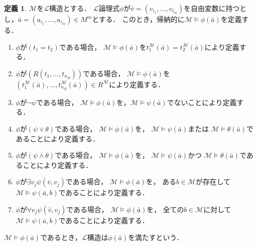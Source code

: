 \documentclass[uplatex, dvipdfmx]{jsarticle}
\numberwithin{equation}{section}
\theoremstyle{definition}
\newtheorem{definition}{定義}[section]
\begin{document}

\begin{definition}
     $\mathcal{M}$を$\mathcal{L}$構造とする．
     $\mathcal{L}$論理式$\phi$が$\bar{v} = (v_{i_1}, \dots, v_{i_m})$を自由変数に持つとし，$\bar{a} = (a_{i_1}, \dots, a_{i_m}) \in M^m$とする．
     このとき，帰納的に$\mathcal{M} \models \phi(\bar{a})$を定義する．
     \begin{enumerate}
          \item 
               $\phi$が$(t_1=t_2)$である場合，
               $\mathcal{M} \models \phi(\bar{a})$を$t_1^\mathcal{M}(\bar{a}) = t_2^\mathcal{M}(\bar{a})$により定義する．
          \item 
               $\phi$が$(R(t_1, \dots, t_{n_R}))$である場合，
               $\mathcal{M} \models \phi(\bar{a})$を$(t_1^\mathcal{M}(\bar{a}), \dots, t_{n_R}^\mathcal{M}(\bar{a}))\in R^\mathcal{M}$により定義する．
          \item
               $\phi$が$\lnot \psi$である場合，
               $\mathcal{M} \models \phi(\bar{a})$を，$\mathcal{M} \models \psi(\bar{a})$でないことにより定義する．
          \item
               $\phi$が$(\psi \lor \theta)$である場合，
               $\mathcal{M} \models \phi(\bar{a})$を，
               $\mathcal{M} \models \psi(\bar{a})$または
               $\mathcal{M} \models \theta(\bar{a})$であることにより定義する．
          \item
               $\phi$が$(\psi \land \theta)$である場合，
               $\mathcal{M} \models \phi(\bar{a})$を，
               $\mathcal{M} \models \psi(\bar{a})$かつ
               $\mathcal{M} \models \theta(\bar{a})$であることにより定義する．
          \item
               $\phi$が$\exists v_j\psi(\bar{v}, v_j)$である場合，
               $\mathcal{M} \models \phi(\bar{a})$を，
               ある$b \in \mathcal{M}$が存在して
               $\mathcal{M} \models \psi(\bar{a},b)$であることにより定義する．
          \item
          $\phi$が$\forall v_j\psi(\bar{v}, v_j)$である場合，
          $\mathcal{M} \models \phi(\bar{a})$を，
          全ての$b \in \mathcal{M}$に対して
          $\mathcal{M} \models \psi(\bar{a},b)$であることにより定義する．
     \end{enumerate}
     $\mathcal{M} \models \phi(\bar{a})$であるとき，$\mathcal{L}$構造は$\phi(\bar{a})$を満たすという．
\end{definition}
\end{document}
